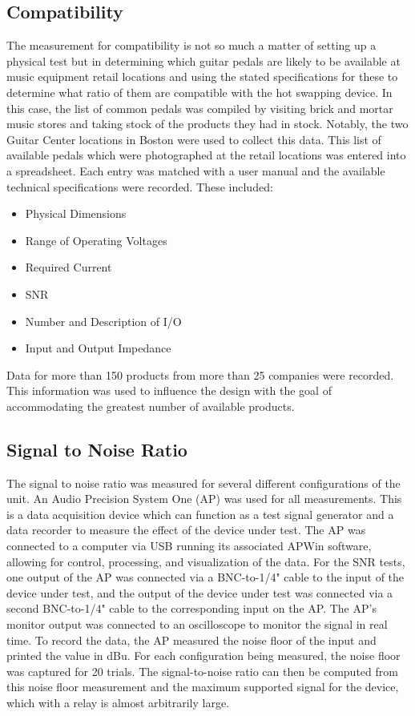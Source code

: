 \documentclass{article}
\begin{document}
	\subsection{Compatibility}
	The measurement for compatibility is not so much a matter of setting up a physical test but in determining which guitar pedals are likely to be available at music equipment retail locations and using the stated specifications for these to determine what ratio of them are compatible with the hot swapping device.  In this case, the list of common pedals was compiled by visiting brick and mortar music stores and taking stock of the products they had in stock.  Notably, the two Guitar Center locations in Boston were used to collect this data.  This list of available pedals which were photographed at the retail locations was entered into a spreadsheet.  Each entry was matched with a user manual and the available technical specifications were recorded.  These included:

	\begin{itemize}
		\item Physical Dimensions
		\item Range of Operating Voltages
		\item Required Current
		\item SNR
		\item Number and Description of I/O
		\item Input and Output Impedance
	\end{itemize}

	Data for more than 150 products from more than 25 companies were recorded.  This information was used to influence the design with the goal of accommodating the greatest number of available products.

	\subsection{Signal to Noise Ratio}
	The signal to noise ratio was measured for several different configurations of the unit.  An Audio Precision System One (AP) was used for all measurements.  This is a data acquisition device which can function as a test signal generator and a data recorder to measure the effect of the device under test.  The AP was connected to a computer via USB running its associated APWin software, allowing for control, processing, and visualization of the data.  For the SNR tests, one output of the AP was connected via a BNC-to-1/4" cable to the input of the device under test, and the output of the device under test was connected via a second BNC-to-1/4" cable to the corresponding input on the AP.  The AP's monitor output was connected to an oscilloscope to monitor the signal in real time.  To record the data, the AP measured the noise floor of the input and printed the value in dBu.  For each configuration being measured, the noise floor was captured for 20 trials.  The signal-to-noise ratio can then be computed from this noise floor measurement and the maximum supported signal for the device, which with a relay is almost arbitrarily large.
\end{document}
